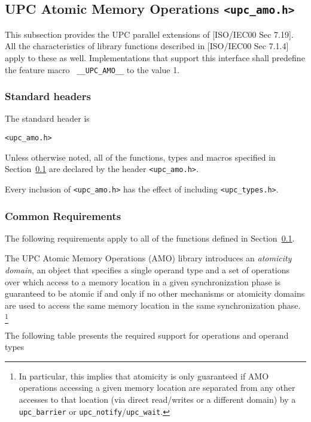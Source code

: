 \subsection{UPC Atomic Memory Operations {\tt <upc\_amo.h>}}
\label{upc-amo}

\npf This subsection provides the UPC parallel extensions of [ISO/IEC00 
    Sec 7.19].  All the characteristics of library functions described
    in [ISO/IEC00 Sec 7.1.4] apply to these as well.  Implementations
    that support this interface shall predefine the feature macro {\tt
    \_\_UPC\_AMO\_\_} to the value 1.

\subsubsection{Standard headers}

\np The standard header is

{\tt <upc\_amo.h>}

\np Unless otherwise noted, all of the functions, types and macros specified
    in Section~\ref{upc-amo} are declared by the header {\tt <upc\_amo.h>}.

\np Every inclusion of {\tt <upc\_amo.h>} has the effect of including
    {\tt <upc\_types.h>}.

\subsubsection{Common Requirements}
\label{upc-amo-reqs}
\npf The following requirements apply to all of the functions defined
     in Section~\ref{upc-amo}.

\np The UPC Atomic Memory Operations (AMO) library introduces an
    \emph{atomicity domain}, an object that specifies a single operand type and
    a set of operations over which access to a memory location in a given
    synchronization phase is guaranteed to be atomic if and only if no other
    mechanisms or atomicity domains are used to access the same memory
    location in the same synchronization phase.~%
    \footnote{In particular, this implies that atomicity is only guaranteed
    if AMO operations accessing a given memory location are separated from any 
    other accesses to that location (via direct read/writes or a different domain) 
    by a {\tt upc\_barrier} or {\tt upc\_notify}/{\tt upc\_wait}.}

\np The following table presents the required support for operations and
    operand types

